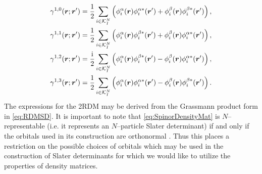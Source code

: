 \begin{subequations}
  \label{eq:SpinorDensityMat}
\begin{align}
  &\gamma^{1,0}(\boldsymbol{r};\boldsymbol{r}') = \frac{1}{2}   \sum_{i\in\mathcal{K}^N_I}\left(\phi^{\alpha}_i(\boldsymbol{r})\phi^{\alpha*}_i(\boldsymbol{r}') + \phi^{\beta}_i(\boldsymbol{r})\phi^{\beta *}_i(\boldsymbol{r}') \right), \\
  &\gamma^{1,1}(\boldsymbol{r};\boldsymbol{r}') = \frac{1}{2}   \sum_{i\in\mathcal{K}^N_I}\left(\phi^{\alpha}_i(\boldsymbol{r})\phi^{\beta *}_i(\boldsymbol{r}') + \phi^{\beta}_i(\boldsymbol{r})\phi^{\alpha*}_i(\boldsymbol{r}') \right), \\
  &\gamma^{1,2}(\boldsymbol{r};\boldsymbol{r}') = \frac{\mathrm i}{2} \sum_{i\in\mathcal{K}^N_I}\left(\phi^{\alpha}_i(\boldsymbol{r})\phi^{\beta *}_i(\boldsymbol{r}') - \phi^{\beta}_i(\boldsymbol{r})\phi^{\alpha*}_i(\boldsymbol{r}') \right), \\
  &\gamma^{1,3}(\boldsymbol{r};\boldsymbol{r}') = \frac{1}{2}   \sum_{i\in\mathcal{K}^N_I}\left(\phi^{\alpha}_i(\boldsymbol{r})\phi^{\alpha*}_i(\boldsymbol{r}') - \phi^{\beta}_i(\boldsymbol{r})\phi^{\beta *}_i(\boldsymbol{r}') \right). 
\end{align}
\end{subequations}
The expressions for the 2RDM may be derived from the Grassmann product form in \cref{eq:RDMSD}. It is important to note that
\cref{eq:SpinorDensityMat} is $N$--representable (i.e. it represents an $N$--particle Slater determinant) if and only if
the orbitals used in its construction are orthonormal \cite{Yang89_book}. Thus this places a restriction on the possible
choices of orbitals which may be used in the construction of Slater determinants for which we would like to utilize the
properties of density matrices.



